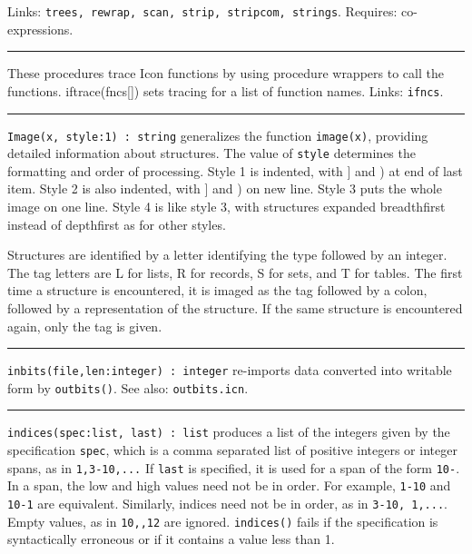 Links: \texttt{trees, rewrap, scan, strip, stripcom, strings}. Requires:
co-expressions.

\vspace{0.25cm}\hrule{}

These procedures trace Icon functions by using procedure
wrappers to call the functions. iftrace(fncs[]) sets tracing for a list
of function names. Links: \texttt{ifncs}.

\vspace{0.25cm}\hrule{}

\texttt{Image(x, style:1) : string} generalizes the function
\texttt{image(x)}, providing detailed information about structures. The
value of \texttt{style} determines the formatting and order of
processing. Style 1 is indented, with ] and ) at end of last item.
Style 2 is also indented, with ] and ) on new line. Style 3 puts the
whole image on one line. Style 4 is like style 3, with structures
expanded breadthfirst instead of depthfirst as for other styles.

Structures are identified by a letter identifying the type followed by
an integer. The tag letters are {\textquotedbl}L{\textquotedbl} for
lists, {\textquotedbl}R{\textquotedbl} for records,
{\textquotedbl}S{\textquotedbl} for sets, and
{\textquotedbl}T{\textquotedbl} for tables. The first time a structure
is encountered, it is imaged as the tag followed by a colon, followed
by a representation of the structure. If the same structure is
encountered again, only the tag is given.

\vspace{0.25cm}\hrule{}

\texttt{inbits(file,len:integer) : integer} re-imports data converted
into writable form by \texttt{outbits()}. See also:
\texttt{outbits.icn}.

\vspace{0.25cm}\hrule{}

\texttt{indices(spec:list, last) : list} produces a list of the integers
given by the specification \texttt{spec}, which is a comma separated
list of positive integers or integer spans, as in
\texttt{{\textquotedbl}1,3-10,...{\textquotedbl}} If \texttt{last} is
specified, it is used for a span of the form
\texttt{{\textquotedbl}10-{\textquotedbl}}. In a span, the low and high
values need not be in order. For example,
\texttt{{\textquotedbl}1-10{\textquotedbl}} and
\texttt{{\textquotedbl}10-1{\textquotedbl}} are equivalent. Similarly,
indices need not be in order, as in \texttt{{\textquotedbl}3-10,
1,...{\textquotedbl}}. Empty values, as in
\texttt{{\textquotedbl}10,,12{\textquotedbl}} are ignored.
\texttt{indices()} fails if the specification is syntactically
erroneous or if it contains a value less than 1. 

